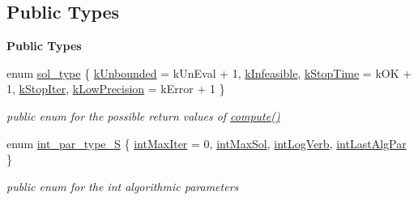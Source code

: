\subsection*{Public Types}
\begin{Indent}\textbf{ Public Types}\par
\begin{DoxyCompactItemize}
\item 
enum \mbox{\hyperlink{class_s_m_spp__di__unipi__it_1_1_solver_a2e0367580e249e8e6018c919bee5481d}{sol\+\_\+type}} \{ \newline
\mbox{\hyperlink{class_s_m_spp__di__unipi__it_1_1_solver_a2e0367580e249e8e6018c919bee5481da4b9de95ee3087851acd98262e09f0be8}{k\+Unbounded}} = k\+Un\+Eval + 1, 
\mbox{\hyperlink{class_s_m_spp__di__unipi__it_1_1_solver_a2e0367580e249e8e6018c919bee5481da7b2be7b643a4c22b61bfa3b203e6d2c6}{k\+Infeasible}}, 
\mbox{\hyperlink{class_s_m_spp__di__unipi__it_1_1_solver_a2e0367580e249e8e6018c919bee5481da276958ff9ecda967369c9cec6b948463}{k\+Stop\+Time}} = k\+OK + 1, 
\mbox{\hyperlink{class_s_m_spp__di__unipi__it_1_1_solver_a2e0367580e249e8e6018c919bee5481da31db5c7ef1857a80e03c6cbca9af589e}{k\+Stop\+Iter}}, 
\newline
\mbox{\hyperlink{class_s_m_spp__di__unipi__it_1_1_solver_a2e0367580e249e8e6018c919bee5481da40a32159eb57f4dd1afc6de9351d3296}{k\+Low\+Precision}} = k\+Error + 1
 \}
\begin{DoxyCompactList}\small\item\em public enum for the possible return values of \mbox{\hyperlink{class_s_m_spp__di__unipi__it_1_1_solver_a504d4e3e174c7a518cc66156a8a45ce5}{compute()}} \end{DoxyCompactList}\item 
enum \mbox{\hyperlink{class_s_m_spp__di__unipi__it_1_1_solver_ac943b88bbfe5d261459af51eadcb5bb6}{int\+\_\+par\+\_\+type\+\_\+S}} \{ \mbox{\hyperlink{class_s_m_spp__di__unipi__it_1_1_solver_ac943b88bbfe5d261459af51eadcb5bb6a18fd973f71832c25b32393317e4d6eca}{int\+Max\+Iter}} = 0, 
\mbox{\hyperlink{class_s_m_spp__di__unipi__it_1_1_solver_ac943b88bbfe5d261459af51eadcb5bb6ae83ca7237a4fc7d768a1cc86c7418e1e}{int\+Max\+Sol}}, 
\mbox{\hyperlink{class_s_m_spp__di__unipi__it_1_1_solver_ac943b88bbfe5d261459af51eadcb5bb6aa2b16022defbda98eb6db89d2a64ddd2}{int\+Log\+Verb}}, 
\mbox{\hyperlink{class_s_m_spp__di__unipi__it_1_1_solver_ac943b88bbfe5d261459af51eadcb5bb6a02f1c0ba6384e528e49a4076bfc21537}{int\+Last\+Alg\+Par}}
 \}
\begin{DoxyCompactList}\small\item\em public enum for the int algorithmic parameters \end{DoxyCompactList}\item 

\end{DoxyCompactItemize}
\end{Indent}
